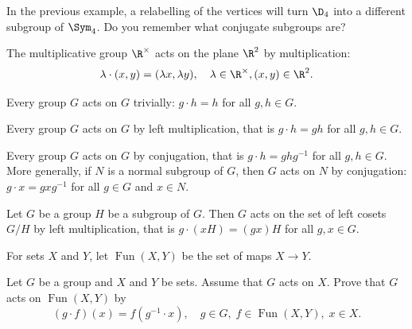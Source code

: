 

In the previous example, a relabelling of the vertices 
will turn $\D_4$ into a different subgroup of $\Sym_4$. Do you remember 
what conjugate subgroups are? 

\begin{example}
    The multiplicative group $\R^{\times}$ acts on the plane $\R^2$ by multiplication: 
    \[ 
    \lambda\cdot (x,y)=(\lambda x,\lambda y),\quad \lambda\in\R^{\times},(x,y)\in\R^2.
    \]
\end{example}

\begin{example}
Every group $G$ acts on $G$ trivially: $g\cdot h=h$ for all $g,h\in G$.
\end{example}

\begin{example}
Every group $G$ acts on $G$ by left multiplication, that is
$g\cdot h=gh$ for all $g,h\in G$.
\end{example}

\begin{example}
Every group $G$ acts on $G$ by conjugation, that is
$g\cdot h=ghg^{-1}$ for all $g,h\in G$. More generally, 
if $N$ is a normal subgroup of $G$, then $G$ acts on
$N$ by conjugation: $g\cdot x=gx
g^{-1}$ for all $g\in G$ and $x\in N$. 
\end{example}

\begin{example}
Let $G$ be a group $H$ be a subgroup of $G$. Then $G$ 
acts on the set of left cosets $G/H$ by left multiplication, that 
is $g\cdot (xH)=(gx)H$ for all $g,x\in G$.
\end{example}

For sets $X$ and $Y$, let 
$\operatorname{Fun}(X,Y)$ be the set of maps $X\to Y$. 

\begin{exercise}
\label{xca:dual}
    Let $G$ be a group and $X$ and $Y$ be sets. Assume that $G$ acts on $X$. 
    Prove that 
    $G$ acts on $\operatorname{Fun}(X,Y)$ by 
    \[ 
        (g\cdot f)(x)=f(g^{-1}\cdot x),\quad g\in G,\; f\in\operatorname{Fun}(X,Y),\; x\in X.
    \]  
\end{exercise}

